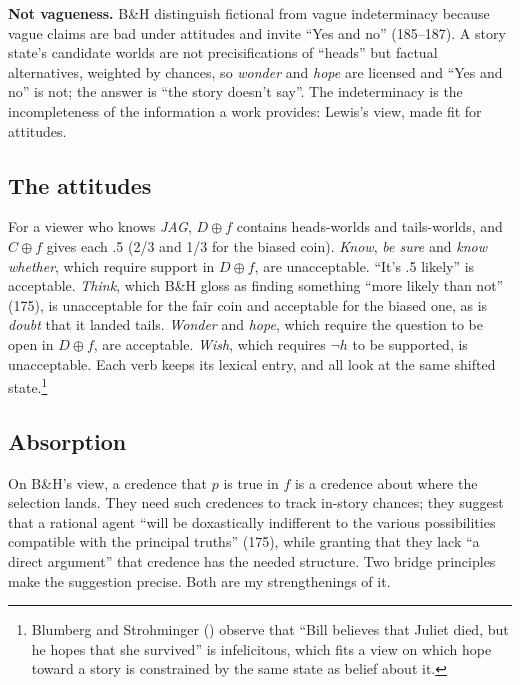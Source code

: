 \documentclass[
  11pt,
  letterpaper,
  DIV=11,
  numbers=noendperiod,
  twoside]{scrartcl}
\begin{document}
\textbf{Not vagueness.} B\&H distinguish fictional from vague
indeterminacy because vague claims are bad under attitudes and invite
``Yes and no'' (185--187). A story state's candidate worlds are not
precisifications of ``heads'' but factual alternatives, weighted by
chances, so \emph{wonder} and \emph{hope} are licensed and ``Yes and
no'' is not; the answer is ``the story doesn't say''. The indeterminacy
is the incompleteness of the information a work provides: Lewis's view,
made fit for attitudes.

\subsection{The attitudes}\label{the-attitudes}

For a viewer who knows \emph{JAG}, \(D \oplus f\) contains heads-worlds
and tails-worlds, and \(C \oplus f\) gives each .5 (2/3 and 1/3 for the
biased coin). \emph{Know}, \emph{be sure} and \emph{know whether}, which
require support in \(D \oplus f\), are unacceptable. ``It's .5 likely''
is acceptable. \emph{Think}, which B\&H gloss as finding something
``more likely than not'' (175), is unacceptable for the fair coin and
acceptable for the biased one, as is \emph{doubt} that it landed tails.
\emph{Wonder} and \emph{hope}, which require the question to be open in
\(D \oplus f\), are acceptable. \emph{Wish}, which requires \(\neg h\)
to be supported, is unacceptable. Each verb keeps its lexical entry, and
all look at the same shifted state.\footnote{Blumberg and Strohminger
  () observe that
  ``Bill believes that Juliet died, but he hopes that she survived'' is
  infelicitous, which fits a view on which hope toward a story is
  constrained by the same state as belief about it.}

\subsection{Absorption}\label{absorption}

On B\&H's view, a credence that \(p\) is true in \(f\) is a credence
about where the selection lands. They need such credences to track
in-story chances; they suggest that a rational agent ``will be
doxastically indifferent to the various possibilities compatible with
the principal truths'' (175), while granting that they lack ``a direct
argument'' that credence has the needed structure. Two bridge principles
make the suggestion precise. Both are my strengthenings of it.
\end{document}
